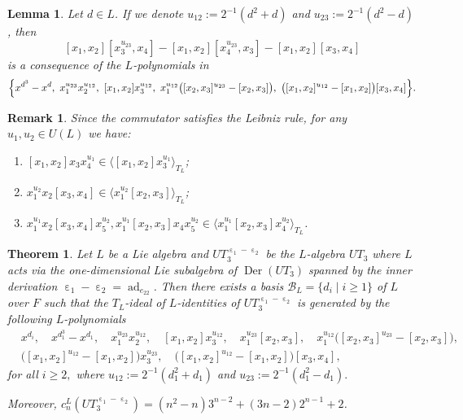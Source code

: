 \documentclass[10pt,a4paper]{amsart}
\newtheorem{lemma}{Lemma}
\newtheorem{theorem}{Theorem}
\newtheorem{remark}{Remark}
\DeclareMathOperator{\D}{Der}
\DeclareMathOperator{\ad}{ad}
\DeclareMathOperator{\e}{\varepsilon}
\begin{document}
\begin{lemma}\label{lem: cons IdUT3e1-e2 6}
    Let $d\in L$. If we denote $u_{12}:=2^{-1}(d^2+d)$ and $u_{23}:=2^{-1}(d^2-d)$, then
   $$
 [x_1,x_2] [x_3^{u_{23}},x_4] - [x_1,x_2] [x_4^{u_{23}},x_3]-[x_1,x_2][x_3,x_4]
$$
is a consequence of the $L$-polynomials in 
\begin{align*}
   \Bigl\{  x^{d^3}-x^{d}, \ x_1^{u_{23}}x_2^{u_{12}}, \ [x_1,x_2]x_3^{u_{12}}, \ x_1^{u_{12}} \big([x_2,x_3]^{u_{23}}-[x_2,x_3]\big),\ \big([x_1,x_2]^{u_{12}}-[x_1,x_2]\big)[x_3,x_4] \Bigr\}.
\end{align*}
\end{lemma}

\begin{remark}\label{rmk: leibniz rule comm}
     Since 
     the commutator satisfies the Leibniz rule, for any $u_1,u_2 \in U(L)$ we have:
    \begin{enumerate}
        \item $[x_1,x_2]x_3x_4^{u_{1}}\in \langle  [x_1,x_2]x_3^{u_{1}}\rangle_{T_L} $; 

        \vspace{1ex}
        \item  $ x_1^{u_{2}}x_2 [x_3, x_4]  \in \langle   x_1^{u_{2}}[x_2, x_3]\rangle_{T_L}$; 
        \vspace{1ex}
         \item $  x_1^{u_{1}}x_2[x_3,x_4]x_5^{u_{2}},  x_1^{u_{1}}[x_2,x_3]x_4x_5^{u_{2}} \in \langle x_1^{u_{1}}[x_2,x_3]x_4^{u_{2}} \rangle_{T_L}$.
    \end{enumerate}
\end{remark}

\begin{theorem}\label{teo: Id^L UT_3 e1-e2}
   Let $L$ be a Lie algebra and $UT_3^{\e_1-\e_2}$  be the $L$-algebra $UT_3$ where $L$ acts via the one-dimensional Lie subalgebra of $\D(UT_3)$ spanned by the inner derivation $\e_1-\e_2 =\ad_{e_{22}}$. Then  
there exists a basis $\mathcal{B}_L=\{d_i \mid i \geq 1\}$ of $L$ over $F$ such that 
the $T_L$-ideal of $L$-identities of $UT_3^{\e_1-\e_2}$ is generated by the following $L$-polynomials
    \begin{align*} 
       & x^{d_i}, \quad x^{d_1^3}-x^{d_1}, \quad  x_1^{u_{23}}x_2^{u_{12}}, \quad [x_1,x_2]x_3^{u_{12}}, \quad  x_1^{u_{23}}[x_2,x_3],\quad  x_1^{u_{12}} \big([x_2,x_3]^{u_{23}}-[x_2,x_3]\big), \\  & \big([x_1,x_2]^{u_{12}}-[x_1,x_2]\big) x_3^{u_{23}},\quad \big([x_1,x_2]^{u_{12}}-[x_1,x_2]\big)[x_3,x_4],
    \end{align*}
for all $i\geq 2,$ where $u_{12}:=2^{-1}(d_1^2+d_1)$ and $u_{23}:=2^{-1}(d_1^2-d_1).$ 

Moreover, $c_n^L(UT_3^{\e_1 -\e_2})=(n^2-n)3^{n-2}+(3n-2)2^{n-1}+2$.
\end{theorem}
\end{document}

